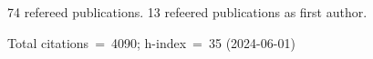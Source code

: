 74 refereed publications. 13 refeered publications as first author.

Total citations~=~4090; h-index~=~35 (2024-06-01)